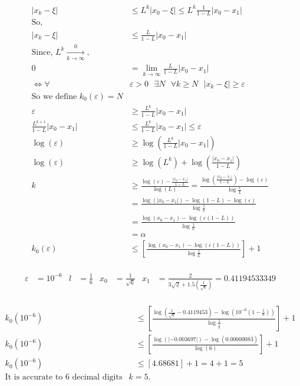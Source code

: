 \documentclass{article}
\begin{document}
\begin{align*}
    |x_k-\xi| &\le L^k|x_0-\xi|\le L^k \frac{1}{1-L}|x_0-x_1|\\
    \text{So,}&\\
    |x_k-\xi|& \le \frac{L}{1-L}|x_0-x_1|\\
    \text{Since, $L^k \xrightarrow[k \to \infty]0$,}\\
    0 &=\lim_{k \to \infty}\frac{L}{1-L}|x_0-x_1|\\
    \Longleftrightarrow \forall& \varepsilon>0 \text{ }\exists N\text{ } \forall k \ge N \text{ }|x_k-\xi|\ge \varepsilon\\
    \text{So we define $k_0(\varepsilon)=N$}&\\
    \varepsilon &\ge \frac{L^k}{1-L}|x_0-x_1|\\
    \frac{L^{k+1}}{1-L}|x_0-x_1|&\le \frac{L^k}{1-L}|x_0-x_1| \le \varepsilon\\
    \log(\varepsilon) &\ge \log\left(\frac{L^k}{1-L}|x_0-x_1|  \right)\\
    \log(\varepsilon) &\ge \log(L^k)+\log \left(\frac{|x_0-x_1|}{1-L}  \right)\\
    k &\ge \frac{\log(\varepsilon)-\frac{|x_0-x_1|}{1-L}}{\log(L)}=\frac{\log{\left(\frac{|x_0-x_1|}{1-L}\right)-\log(\varepsilon)}}{\log{\frac{1}{L}}}\\
    &= \frac{\log{(|x_0-x_1|)}-\log{(1-L)}-\log{(\varepsilon)}}{\log{\frac{1}{L}}}\\
    &=\frac{\log{(x_0-x_1)}-\log{(\varepsilon(1-L))}}{\log{\frac{1}{L}}}\\
    &= \alpha\\
    k_0(\varepsilon)&\le \left[\frac{\log{(x_0-x_1)}-\log{(\varepsilon(1-L))}}{\log{\frac{1}{L}}} \right]+1\\
\end{align*}

\begin{align*}
    \varepsilon&=10^{-6}&l&=\frac{1}{6} &x_0 &= \frac{1}{\sqrt{6}}&x_1&= \frac{2}{3\sqrt{2}+1.5(\frac{1}{\sqrt{6}})}=0.41194533349\\
\end{align*}

\begin{align*}
    k_0(10^{-6})&\le \left[ \frac{\log{(\frac{1}{\sqrt{6}}-0.4119453)}-\log{(10^{-6}(1-\frac{1}{6}))}}{\log{\frac{1}{\frac{1}{6}}}} \right]+1\\
     k_0(10^{-6})&\le \left[ \frac{\log{(|-0.003697|)}-\log{(0.0000008\overline{3})}}{\log{(6)}} \right]+1\\
      k_0(10^{-6})&\le [4.68681]+1= 4+1 = 5\\
      \text{It is accurate to 6 decimal digits is when $k=5$.}
\end{align*}
\end{document}

